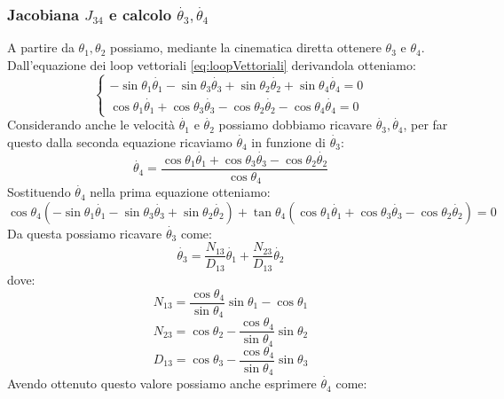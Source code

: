 \subsubsection{Jacobiana $J_{34}$ e calcolo $\dot{\theta_3},\dot{\theta_4}$}
A partire da $\theta_1, \theta_2$ possiamo, mediante la cinematica diretta ottenere $\theta_3$ e $\theta_4$. Dall'equazione dei loop vettoriali \ref{eq:loopVettoriali} derivandola otteniamo: 
\begin{equation}
	\begin{cases}
		-\sin\theta_1 \dot{\theta_1} -\sin\theta_3\dot{\theta_3}+\sin\theta_2\dot{\theta_2}+\sin\theta_4\dot{\theta_4} = 0
		\\ \cos\theta_1\dot{\theta_1} + \cos\theta_3\dot{\theta_3}-\cos\theta_2\dot{\theta_2}-\cos\theta_4\dot{\theta_4} = 0
	\end{cases}
\end{equation}
Considerando anche le velocità $\dot{\theta_1}$ e $\dot{\theta_2}$ possiamo dobbiamo ricavare $\dot{\theta_3}, \dot{\theta_4}$, per far questo dalla seconda equazione ricaviamo $\dot{\theta_4}$ in funzione di $\dot{\theta_3}$:
\begin{equation*}
	\dot{\theta_4} = \frac{\cos\theta_1\dot{\theta_1} + \cos\theta_3\dot{\theta_3}-\cos\theta_2\dot{\theta_2}}{\cos\theta_4}
\end{equation*}
Sostituendo $\dot{\theta_4}$ nella prima equazione otteniamo:
\begin{equation*}
	\cos\theta_4(-\sin\theta_1\dot{\theta_1}-\sin\theta_3\dot{\theta_3}+\sin\theta_2\dot{\theta_2})+\tan\theta_4(\cos\theta_1\dot{\theta_1}+\cos\theta_3\dot{\theta_3}-\cos\theta_2\dot{\theta_2}) = 0
\end{equation*}
Da questa possiamo ricavare $\dot{\theta_3}$ come:
\begin{equation}
	\dot{\theta_3} = \frac{N_{13}}{D_{13}}\dot{\theta_1}+\frac{N_{23}}{D_{13}}\dot{\theta_2}
\end{equation}
dove:
\begin{equation*}
    N_{13} = \frac{\cos\theta_4}{\sin\theta_4}\sin\theta_1-\cos\theta_1
\end{equation*}
\begin{equation*}
    N_{23} = \cos\theta_2-\frac{\cos\theta_4}{\sin\theta_4}\sin\theta_2
\end{equation*}
\begin{equation*}
    D_{13} = \cos\theta_3-\frac{\cos\theta_4}{\sin\theta_4}\sin\theta_3
\end{equation*}
Avendo ottenuto questo valore possiamo anche esprimere $\dot{\theta_4}$ come:
